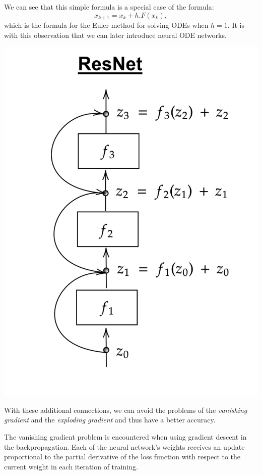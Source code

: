 \documentclass[10pt,a4paper]{article}
\theoremstyle{definition}
\theoremstyle{definition}
\theoremstyle{definition}
\begin{document}
We can see that this simple formula is a special case of the formula:
$$
x_{k+1} = x_k + h.F(x_k),
$$
which is the formula for the Euler method for solving ODEs when $h = 1$. It is with this observation that we can later introduce neural ODE networks.

\begin{center}
\includegraphics[scale=0.18]{resnet.png}
\end{center}

With these additional connections, we can avoid the problems of the \textit{vanishing gradient} and the \textit{exploding gradient} and thus have a better accuracy. 

The vanishing gradient problem is encountered when using gradient descent in the backpropagation. Each of the neural network's weights receives an update proportional to the partial derivative of the loss function with respect to the current weight in each iteration of training. 
\end{document}
